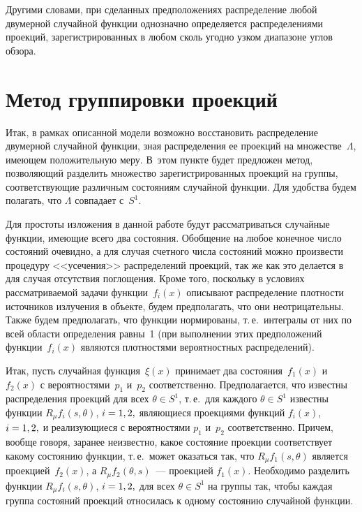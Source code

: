 \begin{multicols}{2}
Другими словами, при сделанных предположениях распределение любой двумерной
случайной функции однозначно определяется распределениями
проекций, зарегистрированных в любом сколь угодно узком диапазоне
углов обзора.

\section{Метод группировки проекций}

Итак, в рамках описанной модели возможно восстановить
распределение двумерной случайной функции, зная распределения
ее проекций на множестве~$\Lambda$, имеющем положительную меру. В~этом пункте будет предложен
метод, позволяющий разделить множество зарегистрированных проекций
на группы, соответствующие различным состояниям случайной функции. 
Для удобства будем полагать, что $\Lambda$ совпадает с~$S^1$.

Для простоты изложения в данной работе будут рассматриваться случайные функции,
име\-ющие всего два состояния. Обобщение на любое конечное число
состояний очевидно, а для случая счетного числа состояний можно
произвести процедуру <<усечения>> распределений проекций, так же как
это делается в~\cite{7-us} для случая отсутствия поглощения. Кроме того,
поскольку в условиях рассматриваемой задачи функции~$f_{i}(x)$
описывают распределение плотности источников излучения в объекте,
будем предполагать, что они неотрицательны. Также будем
предполагать, что функции нормированы, т.\,е.\ интегралы от них по
всей об\-ласти определения равны~1 (при выполнении этих
предположений функции~$f_{i}(x)$ являются плотностями
вероятностных распределений).

Итак, пусть случайная функция~$\xi(x)$ принимает два состояния~$f_{1}(x)$ и~$f_{2}(x)$ с
вероятностями~$p_{1}$ и~$p_{2}$ соответственно.
Предполагается, что известны распределения проекций для всех $\theta\in S^1$, 
т.\,е.\ для каж\-до\-го $\theta\in S^1$ известны функции $R_\mu f_{i}(s,\theta)$, $i\hm=1,2,$ 
являющиеся проекциями функций $f_{i}(x)$, $i\hm=1,2,$ и
реализующиеся с вероятностями $p_{1}$ и~$p_{2}$ соответственно.
Причем, вообще говоря, заранее неизвестно, какое состояние
проекции соответствует какому состоянию функции, т.\,е.\ может оказаться
так, что $R_\mu f_{1}(s,\theta)$ является проекцией~$f_{2}(x)$, а
$R_\mu f_{2}(\theta,s)$~--- проекцией $f_{1}(x)$. Необходимо разделить
функции $R_\mu f_{i}(s,\theta)$, $i\hm=1,2,$ для всех $\theta\in S^1$ на
группы так, чтобы каждая группа состояний проекций относилась к
одному состоянию случайной функции.


\end{multicols}
